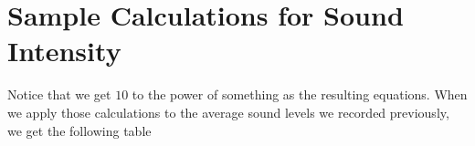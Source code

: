 \documentclass[index]{subfiles}
\begin{document}
\section{Sample Calculations for Sound Intensity}


Notice that we get \(10\) to the power of something as the resulting equations. When we apply those calculations to the average sound levels we recorded previously, we get the following table
\end{document}
